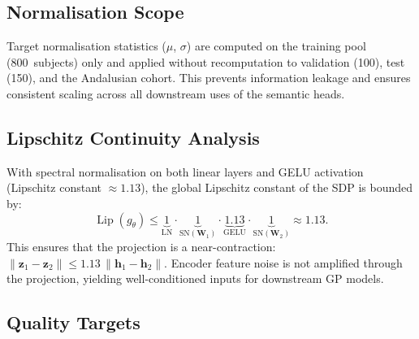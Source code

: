 \subsection{Normalisation Scope}
\label{sec:sdp:normalisation}

Target normalisation statistics ($\mu$, $\sigma$) are computed on the training
pool (800~subjects) only and applied without recomputation to validation
(100), test (150), and the Andalusian cohort. This prevents information
leakage and ensures consistent scaling across all downstream uses of the
semantic heads.

\subsection{Lipschitz Continuity Analysis}
\label{sec:sdp:lipschitz}

With spectral normalisation on both linear layers and GELU activation
(Lipschitz constant $\approx 1.13$), the global Lipschitz constant of the SDP
is bounded by:
\begin{equation}
  \operatorname{Lip}(g_\theta) \leq
    \underbrace{1}_{\text{LN}} \cdot
    \underbrace{1}_{\text{SN}(\mathbf{W}_1)} \cdot
    \underbrace{1.13}_{\text{GELU}} \cdot
    \underbrace{1}_{\text{SN}(\mathbf{W}_2)} \approx 1.13.
  \label{eq:lipschitz}
\end{equation}
This ensures that the projection is a near-contraction:
$\|\mathbf{z}_1 - \mathbf{z}_2\| \leq 1.13\,\|\mathbf{h}_1 - \mathbf{h}_2\|$.
Encoder feature noise is not amplified through the projection, yielding
well-conditioned inputs for downstream GP models.

\subsection{Quality Targets}
\label{sec:sdp:targets}

